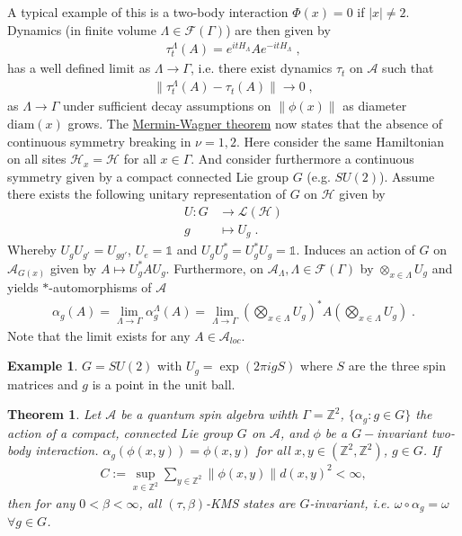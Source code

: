 \documentclass[
a4paper, %
11pt, %
onecolumn, %
openany, %
]{memoir}
\theoremstyle{definition}
\newtheorem{example}{Example}[chapter]
\theoremstyle{remark}
\theoremstyle{plain}
\newtheorem{theorem}{Theorem}[chapter]
\begin{document}
A typical example of this is a two-body interaction $\Phi(x)=0$ if $|x|\neq 2$. Dynamics (in finite volume $\Lambda\in\mathcal{F}(\Gamma)$) are then given by \begin{align}
\tau_t^{\Lambda}(A)=e^{itH_{\Lambda}}Ae^{-itH_{\Lambda}}\; ,
\end{align}
has a well defined limit as $\Lambda\rightarrow\Gamma$, i.e. there exist dynamics $\tau_t$ on $\mathcal{A}$ such that \begin{align}
\|\tau_t^{\Lambda}(A)-\tau_t(A)\|\rightarrow 0\; ,
\end{align}
as $\Lambda\rightarrow \Gamma$ under sufficient decay assumptions on $\|\phi(x)\|$ as diameter $\mathrm{diam}(x)$ grows. The \underline{Mermin-Wagner theorem} now states that the absence of continuous symmetry breaking in $\nu=1,2$. Here consider the same Hamiltonian on all sites $\mathcal{H}_x=\mathcal{H}$ for all $x\in\Gamma$. And consider furthermore a continuous symmetry given by a compact connected Lie group $G$ (e.g. $SU(2)$). Assume there exists the following unitary representation of $G$ on $\mathcal{H}$ given by \begin{align}
U:G&\longrightarrow \mathcal{L}(\mathcal{H}) \\
g&\longmapsto U_g\; .
\end{align}
Whereby $U_gU_{g'}=U_{gg'}$, $U_{e}=\mathds{1}$ and $U_gU_g^*=U_g^*U_g=\mathds{1}$. Induces an action of $G$ on $\mathcal{A}_{G(x)}$ given by $A\mapsto U_g^*A U_g$. Furthermore, on $\mathcal{A}_{\Lambda}, \Lambda\in\mathcal{F}(\Gamma)$ by $\otimes_{x\in\Lambda}U_g$ and yields $*$-automorphisms of $\mathcal{A}$ \begin{align}
\alpha_g(A)=\lim_{\Lambda\rightarrow\Gamma}\alpha_g^{\Lambda}(A) =\lim_{\Lambda\rightarrow\Gamma} \left(\bigotimes_{x\in\Lambda}U_g\right)^*A\left(\bigotimes_{x\in\Lambda}U_g\right)\; .
\end{align}
Note that the limit exists for any $A\in\mathcal{A}_{loc}$.
\begin{example}
$G=SU(2)$ with $U_g=\exp(2\pi i g S)$ where $S$ are the three spin matrices and $g$ is a point in the unit ball.
\end{example}
\begin{theorem}
Let $\mathcal{A}$ be a quantum spin algebra wihth $\Gamma=\mathbb{Z}^2$, $\{\alpha_g:g\in G\}$ the action of a compact, connected Lie group $G$ on $\mathcal{A}$, and $\phi$ be a $G-$invariant two-body interaction. $\alpha_g(\phi(x,y))=\phi(x,y)$ for all $x,y\in(\mathbb{Z}^2,\mathbb{Z}^2)$, $g\in G$. If \begin{align}
C:=\sup_{x\in\mathbb{Z}^2}\sum_{y\in\mathbb{Z}^2}\|\phi(x,y)\| d(x,y)^2<\infty,
\end{align}
then for any $0<\beta<\infty$, all $(\tau,\beta)$-KMS states are $G$-invariant, i.e. $\omega\circ\alpha_g=\omega$ $\forall g\in G$.
\end{theorem}
\end{document}
